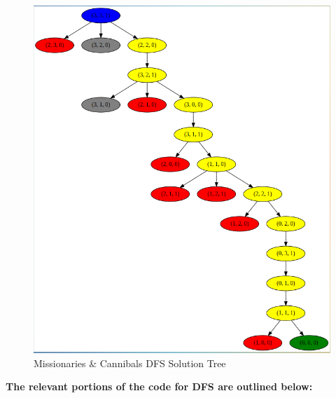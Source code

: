 \documentclass[12pt]{article}
\begin{document}
\begin{figure}[h]
  \centerline{\includegraphics[width = 150mm]{MnC_DFS.png}}
  \caption{Missionaries & Cannibals DFS Solution Tree}
  \label{fig}
\end{figure}
\textbf{The relevant portions of the code for DFS are outlined below:}
\end{document}
